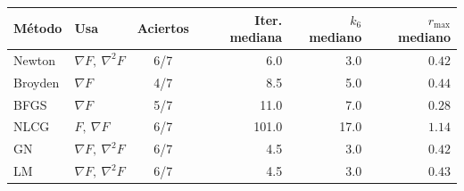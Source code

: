 \begin{tabular}{l l c r r r}
\toprule
\rowcolor{Azul1!50}
Método & Usa & Aciertos & Iter. mediana & $k_6$ mediano & $r_{\max}$ mediano \\
\midrule
Newton & $\nabla F,\ \nabla^2F$ & 6/7 & 6.0 & 3.0 & $0.42$ \\
Broyden & $\nabla F$ & 4/7 & 8.5 & 5.0 & $0.44$ \\
BFGS & $\nabla F$ & 5/7 & 11.0 & 7.0 & $0.28$ \\
NLCG & $F,\ \nabla F$ & 6/7 & 101.0 & 17.0 & $1.14$ \\
GN & $\nabla F,\ \nabla^2F$ & 6/7 & 4.5 & 3.0 & $0.42$ \\
LM & $\nabla F,\ \nabla^2F$ & 6/7 & 4.5 & 3.0 & $0.43$ \\
\bottomrule
\end{tabular}
